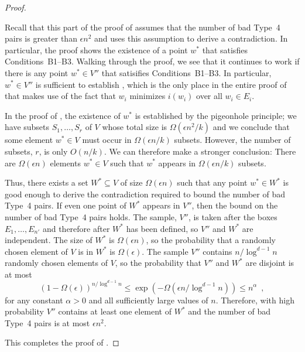 \documentclass{patmorin}
\begin{document}
\begin{proof}
\begin{enumerate}
      Recall that this part of the proof of  assumes
      that the number of bad Type~4 pairs is greater than $\epsilon
      n^2$ and uses this assumption to derive a contradiction.
      In particular, the proof shows the existence of a point $w^*$
      that satisfies Conditions~B1--B3.  Walking through the proof, we
      see that it continues to work if there is any point $w^*\in V''$
      that satisifies Conditions~B1--B3.  In particular, $w^*\in V''$
      is sufficient to establish , which is the only place
      in the entire proof of  that makes use of the
      fact that $w_i$ minimizes $i(w_i)$ over all $w_i\in E_i$.

      In the proof of , the existence of $w^*$
      is established by the pigeonhole principle; we have subsets
      $S_1,\ldots,S_r$ of $V$ whose total size is $\Omega(\epsilon
      n^2/k)$ and we conclude that some element $w^*\in V$ must occur in
      $\Omega(\epsilon n/k)$ subsets.  However, the number of subsets,
      $r$, is only $O(n/k)$.  We can therefore make a stronger conclusion:
      There are $\Omega(\epsilon n)$ elements $w^*\in V$ such that $w^*$
      appears in $\Omega(\epsilon n/k)$ subsets.

      Thus, there exists a set $W^*\subseteq V$ of size $\Omega(\epsilon
      n)$ such that any point $w^*\in W^*$ is good enough to derive the
      contradiction required to bound the number of bad Type~4 pairs.
      If even one point of $W^*$ appears in $V''$, then the bound on the
      number of bad Type~4 pairs holds.  The sample, $V''$, is taken after
      the boxes $E_1,\ldots,E_{n'}$ and therefore after $W^*$ has been
      defined, so $V''$ and $W^*$ are independent.  The size of $W^*$
      is $\Omega(\epsilon n)$, so the probability that a randomly chosen
      element of $V$ is in $W^*$ is $\Omega(\epsilon)$. The sample $V''$
      contains $n/\log^{d-1} n$ randomly chosen elements of $V$, so the
      probability that $V''$ and $W^*$ are disjoint is at most
      \[
         (1-\Omega(\epsilon))^{n/\log^{d-1} n} 
            \le \exp(-\Omega(\epsilon n/\log^{d-1} n)) 
            \le n^{\alpha} \enspace ,
      \]
      for any constant $\alpha >0$ and all sufficiently large values
      of $n$.  Therefore, with high probability $V''$ contains at least
      one element of $W^*$ and the number of bad Type~4 pairs is at most
      $\epsilon n^2$.
  \end{enumerate}
  This completes the proof of .
\end{proof}
\end{document}

